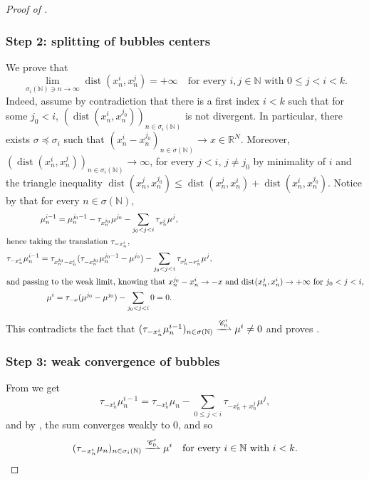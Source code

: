 \documentclass[11pt]{article}
\theoremstyle{plain}
\theoremstyle{definition}
\newcommand{\N}{\mathbb{N}}
\newcommand{\R}{\mathbb{R}}
\newcommand{\Cspace}{\mathscr{C}}
\DeclareMathOperator{\dist}{dist}
\newcommand{\mweakto}{\xrightharpoonup{\Cspace_0'}}
\numberwithin{equation}{section}
\begin{document}
\begin{proof}[Proof of ]
\subsubsection*{Step 2: splitting of bubbles centers} We prove that
\begin{equation}\label{splittingWeak}
\lim_{\sigma_i(\N) \ni n\to\infty} \dist(x^i_{n},x^j_{n}) =+\infty \quad\text{for every \(i,j\in\N\) with \(0\le j<i<k\)}.
\end{equation}
Indeed, assume by contradiction that there is a first index \(i<k\) such that for some \(j_0<i\), \((\dist(x^i_{n},x^{j_0}_{n}))_{n\in\sigma_i(\N)}\) is not divergent. In particular, there exists \(\sigma\preceq\sigma_i\) such that \((x^i_{n}-x^{j_0}_{n})_{n\in\sigma(\N)}\to x\in\R^N\). Moreover, \((\dist(x^i_n,x^j_n))_{n\in\sigma_i(\N)}\to\infty\), for every \(j<i\), \(j\neq j_0\) by minimality of $i$ and the triangle inequality $\dist(x_n^j,x_n^{j_0}) \leq \dist(x_n^j,x_n^i) + \dist(x_n^i,x_n^{j_0})$. Notice by  that for every $n\in \sigma(\N)$,
\begin{gather*}
\mu_n^{i-1} = \mu_n^{j_0-1} - \tau_{x_n^{j_0}} \mu^{j_0} - \sum_{j_0 < j < i} \tau_{x_n^j} \mu^j,\\
\shortintertext{hence taking the translation $\tau_{-x_n^i}$,}
\tau_{-x_n^i} \mu_n^{i-1} = \tau_{x_n^{j_0}-x_n^i} (\tau_{-x_n^{j_0}} \mu_n^{j_0-1}-\mu^{j_0}) - \sum_{j_0 < j < i} \tau_{x_n^j-x_n^i} \mu^j,\\
\shortintertext{and passing to the weak limit, knowing that $x_n^{j_0}-x_n^i \to -x$ and $\dist(x_n^j,x_n^i) \to +\infty$ for $j_0 < j <i$,}
\mu^i = \tau_{-x}(\mu^{j_0}-\mu^{j_0}) - \sum_{j_0 < j < i} 0 = 0.
\end{gather*}
This contradicts the fact that \((\tau_{-x^i_n}\mu^{i-1}_n)_{n\in\sigma(\N)}\mweakto\mu^i\neq 0\) and proves .

\subsubsection*{Step 3: weak convergence of bubbles}
From  we get\vspace*{-3pt}
\begin{equation}\label{bubbleWeak}
\tau_{-x^i_n}\mu^{i-1}_n =\tau_{-x^i_n}\mu_n-\sum_{0\le j<i}\tau_{-x^i_n+x^j_n}\mu^j,
\end{equation}
and by , the sum converges weakly to $0$, and so\vspace*{-3pt}\enlargethispage{\baselineskip}
\begin{equation}\label{bubbleWeakConvergence}
(\tau_{-x^i_n}\mu_n)_{n\in\sigma_i(\N)}\mweakto \mu^i\quad\text{for every \(i\in\N\) with \(i<k\)}.
\end{equation}


\end{proof}
\end{document}
